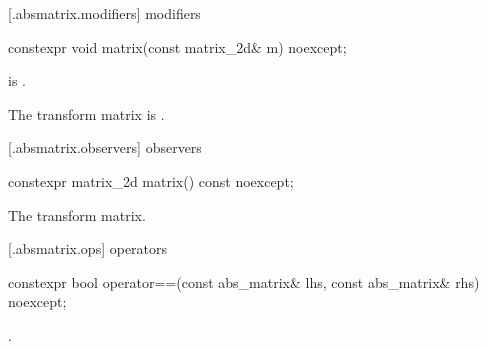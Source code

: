  [\iotwod.absmatrix.modifiers]{ modifiers}

%
\begin{itemdecl}
constexpr void matrix(const matrix_2d& m) noexcept;
\end{itemdecl}
\begin{itemdescr}
\pnum
\requires
{} is .

\pnum
\effects
The transform matrix is .
\end{itemdescr}

 [\iotwod.absmatrix.observers]{ observers}

%
\begin{itemdecl}
constexpr matrix_2d matrix() const noexcept;
\end{itemdecl}
\begin{itemdescr}
\pnum
\returns
The transform matrix.
\end{itemdescr}

 [\iotwod.absmatrix.ops]{ operators}

%
\begin{itemdecl}
constexpr bool operator==(const abs_matrix& lhs, const abs_matrix& rhs) 
  noexcept;
\end{itemdecl}
\begin{itemdescr}
\pnum
\returns
{}.
\end{itemdescr}
